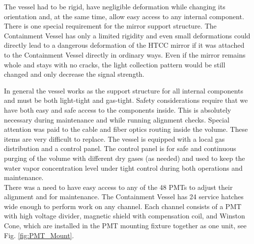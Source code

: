 The vessel had to be rigid, have negligible deformation while changing its orientation and, at the same time, allow easy access to any internal component. There is one special requirement for the mirror support structure. The Containment Vessel has only a limited rigidity and even small deformations could directly lead to a dangerous deformation of the HTCC mirror if it was attached to the Containment Vessel directly in ordinary ways. Even if the mirror remains whole and stays with no cracks, the light collection pattern would be still changed and only decrease the signal strength.

In general the vessel works as the support structure for all internal components and must be both light-tight and gas-tight. Safety considerations require that we have both easy and safe access to the components inside. This is absolutely necessary during maintenance and while running alignment checks. Special attention was paid to the cable and fiber optics routing inside the volume. These items are very difficult to replace. The vessel is equipped with a local gas distribution and a control panel. The control panel is for safe and continuous purging of the volume with different dry gases (as needed) and used to keep the water vapor concentration level under tight control during both  operations and maintenance.\\
\indent There was a need to have easy access to any of the 48 PMTs to adjust their alignment and for maintenance. The Containment Vessel has 24 service hatches wide enough to perform work on any channel. Each channel consists of a PMT with high voltage divider, magnetic shield with compensation coil, and Winston Cone, which are installed in the PMT mounting fixture together as one unit, see Fig. \ref{fig:PMT_Mount}.

